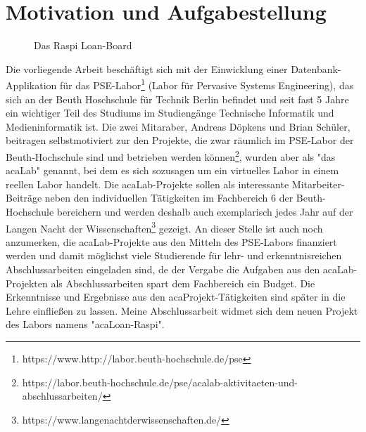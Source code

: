 \section{Motivation und Aufgabestellung}
\label{sec:intro:motivation}
\begin{figure}
	\caption{Das Raspi Loan-Board }
	\label{fig:click}
\end{figure}

Die vorliegende Arbeit beschäftigt sich mit der Einwicklung einer Datenbank-Applikation für das PSE-Labor\footnote{https://www.http://labor.beuth-hochschule.de/pse} (Labor für Pervasive Systems Engineering), das sich an der Beuth Hoschschule für Technik Berlin befindet und seit fast 5 Jahre ein wichtiger Teil des Studiums im Studiengänge Technische Informatik und Medieninformatik ist. Die zwei Mitaraber, Andreas Döpkens und Brian Schüler, beitragen selbstmotiviert zur den  Projekte, die zwar räumlich im PSE-Labor der Beuth-Hochschule sind und betrieben werden können\footnote{https://labor.beuth-hochschule.de/pse/acalab-aktivitaeten-und-abschlussarbeiten/}, wurden aber als "das acaLab" genannt, bei dem es sich sozusagen um ein virtuelles Labor in einem reellen Labor handelt. Die acaLab-Projekte sollen als interessante Mitarbeiter-Beiträge neben den individuellen Tätigkeiten im Fachbereich 6 der Beuth-Hochschule bereichern und werden deshalb auch exemplarisch jedes Jahr auf der Langen Nacht der Wissenschaften\footnote{https://www.langenachtderwissenschaften.de/} gezeigt. An dieser Stelle ist auch noch anzumerken, die acaLab-Projekte aus den Mitteln des PSE-Labors finanziert werden und damit möglichst viele Studierende für lehr- und erkenntnisreichen Abschlussarbeiten eingeladen sind, de der Vergabe die Aufgaben aus den acaLab-Projekten als Abschlussarbeiten spart dem Fachbereich ein Budget. Die Erkenntnisse und Ergebnisse aus den acaProjekt-Tätigkeiten sind später in die Lehre einfließen zu lassen.\cite{website:1} Meine Abschlussarbeit widmet sich dem neuen Projekt des Labors namens "acaLoan-Raspi".

